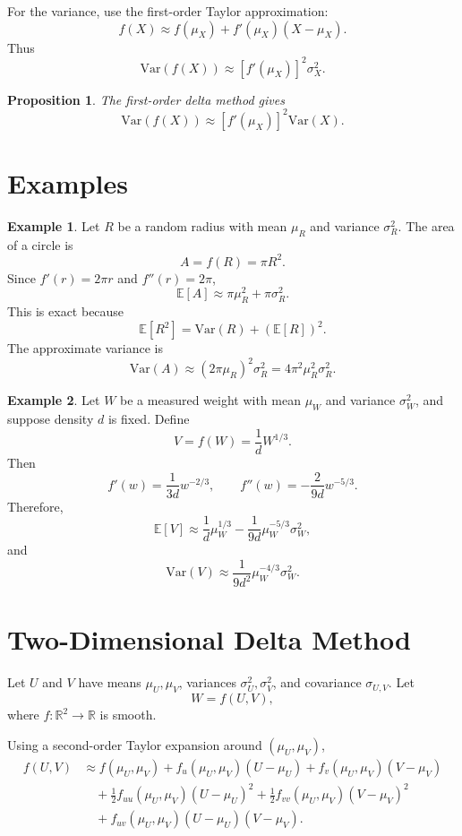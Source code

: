 \documentclass[12pt,oneside]{book}
\numberwithin{equation}{section}
\theoremstyle{definition}
\newtheorem{example}{Example}[section]
\theoremstyle{plain}
\newtheorem{proposition}{Proposition}[section]
\theoremstyle{remark}
\newcommand{\R}{\mathbb{R}}
\newcommand{\E}{\mathbb{E}}
\newcommand{\Var}{\mathrm{Var}}
\begin{document}
For the variance, use the first-order Taylor approximation:
\[
f(X) \approx f(\mu_X) + f'(\mu_X)(X-\mu_X).
\]
Thus
\[
\Var(f(X)) \approx [f'(\mu_X)]^2\sigma_X^2.
\]

\begin{proposition}
The first-order delta method gives
\[
\Var(f(X)) \approx [f'(\mu_X)]^2\Var(X).
\]
\end{proposition}

\section{Examples}

\begin{example}
Let $R$ be a random radius with mean $\mu_R$ and variance $\sigma_R^2$. The area of a circle is
\[
A = f(R) = \pi R^2.
\]
Since $f'(r)=2\pi r$ and $f''(r)=2\pi$,
\[
\E[A] \approx \pi \mu_R^2 + \pi \sigma_R^2.
\]
This is exact because
\[
\E[R^2] = \Var(R) + (\E[R])^2.
\]
The approximate variance is
\[
\Var(A) \approx (2\pi \mu_R)^2\sigma_R^2
= 4\pi^2 \mu_R^2\sigma_R^2.
\]
\end{example}

\begin{example}
Let $W$ be a measured weight with mean $\mu_W$ and variance $\sigma_W^2$, and suppose density $d$ is fixed. Define
\[
V = f(W) = \frac{1}{d}W^{1/3}.
\]
Then
\[
f'(w)=\frac{1}{3d}w^{-2/3},
\qquad
f''(w)=-\frac{2}{9d}w^{-5/3}.
\]
Therefore,
\[
\E[V] \approx \frac{1}{d}\mu_W^{1/3}
-\frac{1}{9d}\mu_W^{-5/3}\sigma_W^2,
\]
and
\[
\Var(V) \approx \frac{1}{9d^2}\mu_W^{-4/3}\sigma_W^2.
\]
\end{example}

\section{Two-Dimensional Delta Method}

Let $U$ and $V$ have means $\mu_U,\mu_V$, variances $\sigma_U^2,\sigma_V^2$, and covariance $\sigma_{U,V}$. Let
\[
W=f(U,V),
\]
where $f:\R^2\to\R$ is smooth.

Using a second-order Taylor expansion around $(\mu_U,\mu_V)$,
\[
\begin{aligned}
f(U,V)
&\approx f(\mu_U,\mu_V)
+ f_u(\mu_U,\mu_V)(U-\mu_U)
+ f_v(\mu_U,\mu_V)(V-\mu_V) \\
&\quad
+ \frac{1}{2}f_{uu}(\mu_U,\mu_V)(U-\mu_U)^2
+ \frac{1}{2}f_{vv}(\mu_U,\mu_V)(V-\mu_V)^2 \\
&\quad
+ f_{uv}(\mu_U,\mu_V)(U-\mu_U)(V-\mu_V).
\end{aligned}
\]
\end{document}
